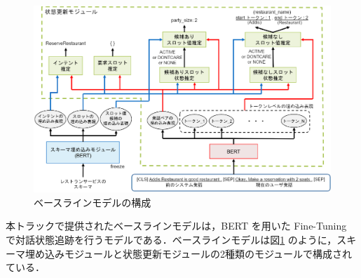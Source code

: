 \begin{figure}[thb]
    \centering
    \includegraphics[width=15cm]{chapter3/baseline.eps}
    \caption{ベースラインモデルの構成}
    \label{fig:baseline}
  \end{figure}

本トラックで提供されたベースラインモデルは，BERT を用いた Fine-Tuning で対話状態追跡を行うモデルである．ベースラインモデルは図\ref{fig:baseline} のように，スキーマ埋め込みモジュールと状態更新モジュールの2種類のモジュールで構成されている．